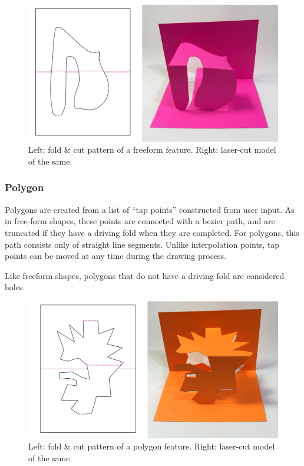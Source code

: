 \begin{figure}[htbp]
\centering
\includegraphics{figures/33_UI_Interface_Data_Structures/free.pdf}
\caption{Left: fold \& cut pattern of a freeform feature. Right:
laser-cut model of the same.}
\end{figure}

\subsubsection{Polygon}\label{polygon}

Polygons are created from a list of ``tap points'' constructed from user
input. As in free-form shapes, these points are connected with a bezier
path, and are truncated if they have a driving fold when they are
completed. For polygons, this path consists only of straight line
segments. Unlike interpolation points, tap points can be moved at any
time during the drawing process.

Like freeform shapes, polygons that do not have a driving fold are
considered holes.

\begin{figure}[htbp]
\centering
\includegraphics{figures/33_UI_Interface_Data_Structures/poly.pdf}
\caption{Left: fold \& cut pattern of a polygon feature. Right:
laser-cut model of the same.}
\end{figure}

